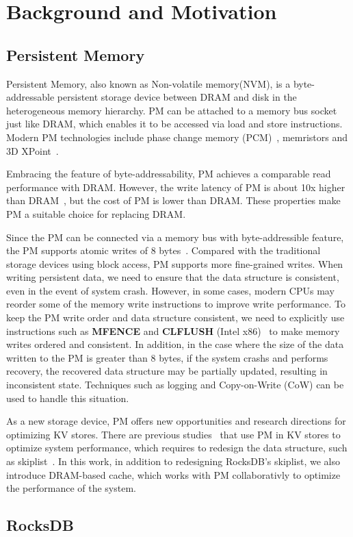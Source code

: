 \section{Background and Motivation}
\subsection{Persistent Memory}
Persistent Memory, also known as Non-volatile memory(NVM), is a byte-addressable persistent storage device between DRAM and disk in the heterogeneous memory hierarchy. PM can be attached to a memory bus socket just like DRAM, which enables it to be accessed via load and store instructions. Modern PM technologies include phase change memory (PCM)~\cite{PCM}, memristors and 3D XPoint~\cite{3DXPoint}.

Embracing the feature of byte-addressability, PM achieves a comparable read performance with DRAM. However, the write latency of PM is about 10x higher than DRAM~\cite{DBLP:conf/usenix/XiaJXS17}, but the cost of PM is lower than DRAM. These properties make PM a suitable choice for replacing DRAM.

Since the PM can be connected via a memory bus with byte-addressible feature, the PM supports atomic writes of 8 bytes~\cite{DBLP:conf/fast/LeeLSNN17}. Compared with the traditional storage devices using block access, PM supports more fine-grained writes. When writing persistent data, we need to ensure that the data structure is consistent, even in the event of system crash. However, in some cases, modern CPUs may reorder some of the memory write instructions to improve write performance. To keep the PM write order and data structure consistent, we need to explicitly use instructions such as \textbf{MFENCE} and \textbf{CLFLUSH} (Intel x86)~\cite{SLMDB,DBLP:conf/fast/LeeLSNN17,DBLP:conf/usenix/KannanBGAA18} to make memory writes ordered and consistent. In addition, in the case where the size of the data written to the PM is greater than 8 bytes, if the system crashs and performs recovery, the recovered data structure may be partially updated, resulting in inconsistent state. Techniques such as logging and Copy-on-Write (CoW) can be used to handle this situation.


As a new storage device, PM offers new opportunities and research directions for optimizing KV stores. There are previous studies~\cite{NVMRocks,DBLP:conf/usenix/KannanBGAA18,DBLP:conf/usenix/XiaJXS17} that use PM in KV stores to optimize system performance, which requires to redesign the data structure, such as skiplist~\cite{DBLP:conf/usenix/KannanBGAA18, SLMDB}. In this work, in addition to redesigning RocksDB's skiplist, we also introduce DRAM-based cache, which works with PM collaborativly to optimize the performance of the system.
\subsection{RocksDB}